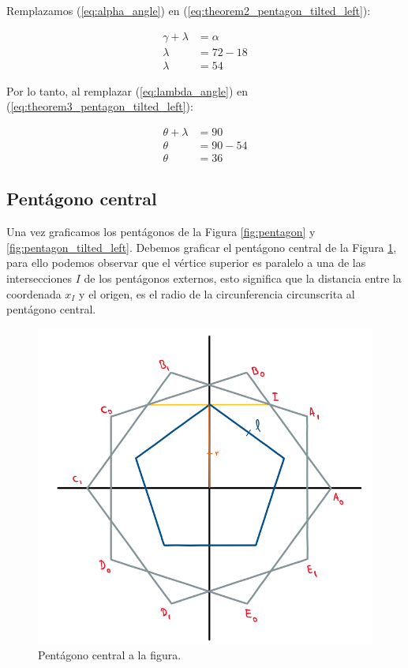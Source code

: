 \documentclass[oneside, a4paper]{article}
\begin{document}
            Remplazamos (\ref{eq:alpha_angle}) en (\ref{eq:theorem2_pentagon_tilted_left}):

            \begin{align}
                \gamma + \lambda & = \alpha \nonumber\\
                \lambda & = 72 - 18 \nonumber\\
                \lambda & = 54 \label{eq:lambda_angle}
            \end{align}

            Por lo tanto, al remplazar (\ref{eq:lambda_angle}) en (\ref{eq:theorem3_pentagon_tilted_left}):

            \begin{align}
                \theta + \lambda & = 90 \nonumber\\
                \theta & = 90 - 54 \nonumber\\
                \theta & = 36 \label{eq:theta_angle_pentagon_tilted_left}
            \end{align}

        \subsection{Pentágono central}
            Una vez graficamos los pentágonos de la Figura \ref{fig:pentagon} y \ref{fig:pentagon_tilted_left}. Debemos graficar el pentágono central de la Figura \ref{fig:center_pentagon}, para ello podemos observar que el vértice superior es paralelo a una de las intersecciones $I$ de los pentágonos externos, esto significa que la distancia entre la coordenada $x_{I}$ y el origen, es el radio de la circunferencia circunscrita al pentágono central.

            \begin{figure}[H]
                \centering
                \includegraphics[scale=0.5]{center_pentagon.png}
                \caption{Pentágono central a la figura.}
                \label{fig:center_pentagon}
            \end{figure}
\end{document}
